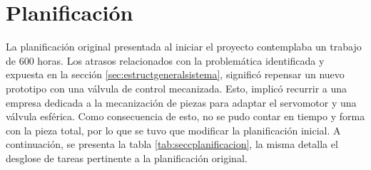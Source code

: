\section{Planificación}
\label{sec:planificacion}
La planificación original presentada al iniciar el proyecto contemplaba un trabajo de 600 horas. Los atrasos relacionados con la problemática identificada y expuesta en la sección \ref{sec:estructgeneralsistema}, significó repensar un nuevo prototipo con una válvula de control  mecanizada. Esto, implicó recurrir a una empresa dedicada a la mecanización de piezas para adaptar el servomotor y una válvula esférica. Como consecuencia de esto, no se pudo contar en tiempo y forma con la pieza total, por lo que se tuvo que modificar la planificación inicial. 
A continuación, se presenta la tabla \ref{tab:seccplanificacion}, la misma detalla el desglose de tareas pertinente a la planificación original. 
